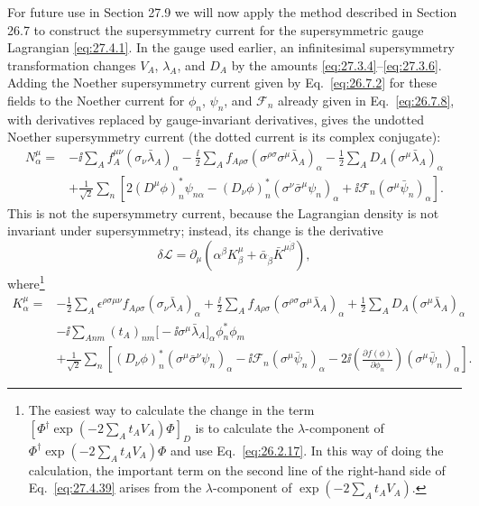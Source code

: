 For future use in Section 27.9 we will now apply the method described in
Section 26.7 to construct the supersymmetry current for the supersymmetric
gauge Lagrangian \eqref{eq:27.4.1}. In the gauge used earlier, an
infinitesimal supersymmetry transformation changes \(V_A\), \(\lambda_A\),
and \(D_A\) by the amounts \eqref{eq:27.3.4}--\eqref{eq:27.3.6}. Adding the
Noether supersymmetry current given by Eq.~\eqref{eq:26.7.2} for these fields
to the Noether current for \(\phi_n\), \(\psi_n\), and \(\mathcal{F}_n\)
already given in Eq.~\eqref{eq:26.7.8}, with derivatives replaced by
gauge-invariant derivatives, gives the undotted Noether supersymmetry
current (the dotted current is its complex conjugate):
\begin{equation}
  \begin{aligned}
  N^\mu_\alpha={}&
  -\ii\sum_Af_A^{\mu\nu}(\sigma_\nu\bar\lambda_A)_\alpha
  -\frac{\ii}{2}\sum_Af_{A\rho\sigma}
    (\sigma^{\rho\sigma}\sigma^\mu\bar\lambda_A)_\alpha
  -\frac12\sum_AD_A(\sigma^\mu\bar\lambda_A)_\alpha
  \\
  &+\frac1{\sqrt{2}}\sum_n\left[
    2(D^\mu\phi)_n^*\psi_{n\alpha}
    -(D_\nu\phi)_n^*
      (\sigma^\nu\bar\sigma^\mu\psi_n)_\alpha
    +\ii\mathcal{F}_n(\sigma^\mu\bar\psi_n)_\alpha
  \right].
  \end{aligned}
  \tag{27.4.37}\label{eq:27.4.37}
\end{equation}
This is not the supersymmetry current, because the Lagrangian density is not
invariant under supersymmetry; instead, its change is the derivative
\begin{equation}
  \delta\mathcal{L}
  =\partial_\mu\left(
    \alpha^\beta K^\mu_\beta
    +\bar\alpha_{\dot\beta}\bar K^{\mu\dot\beta}\right),
  \tag{27.4.38}\label{eq:27.4.38}
\end{equation}
where\footnote{The easiest way to calculate the change in the term
\(\left[\Phi^\dagger\exp(-2\sum_A t_AV_A)\Phi\right]_D\) is to calculate the
\(\lambda\)-component of
\(\Phi^\dagger\exp(-2\sum_A t_AV_A)\Phi\) and use
Eq.~\eqref{eq:26.2.17}. In this way of doing the calculation, the important
term on the second line of the right-hand side of Eq.~\eqref{eq:27.4.39}
arises from the \(\lambda\)-component of
\(\exp(-2\sum_A t_AV_A)\).}
\begin{equation}
  \begin{aligned}
  K^\mu_\alpha={}&
  -\frac12\sum_A
    \epsilon^{\rho\sigma\mu\nu}f_{A\rho\sigma}
    (\sigma_\nu\bar\lambda_A)_\alpha
  +\frac{\ii}{2}\sum_Af_{A\rho\sigma}
    (\sigma^{\rho\sigma}\sigma^\mu\bar\lambda_A)_\alpha
  +\frac12\sum_AD_A(\sigma^\mu\bar\lambda_A)_\alpha
  \\
  &-\ii\sum_{Anm}(t_A)_{nm}
    \bigl[-\ii\sigma^\mu\bar\lambda_A\bigr]_\alpha\phi_n^*\phi_m
  \\
  &+\frac1{\sqrt{2}}\sum_n\left[
    (D_\nu\phi)_n^*
      (\sigma^\mu\bar\sigma^\nu\psi_n)_\alpha
    -\ii\mathcal{F}_n(\sigma^\mu\bar\psi_n)_\alpha
    -2\ii\left(\frac{\partial f(\phi)}{\partial\phi_n}\right)
      (\sigma^\mu\bar\psi_n)_\alpha
  \right].
  \end{aligned}
  \tag{27.4.39}\label{eq:27.4.39}
\end{equation}
